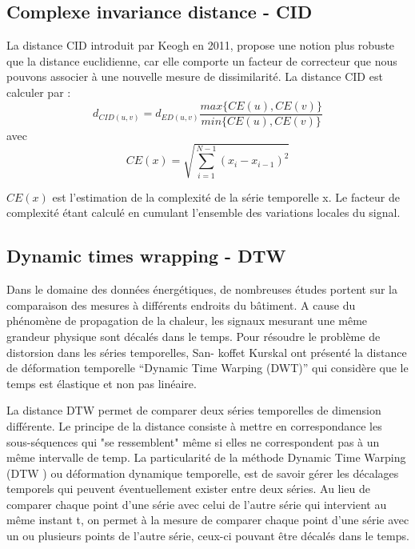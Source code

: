 \subsection{Complexe invariance distance -  CID}
La distance CID introduit par Keogh en 2011\cite{batista2011}, propose une notion plus robuste que la
distance euclidienne, car elle comporte un facteur de correcteur que nous pouvons associer à une
nouvelle mesure de dissimilarité. La distance CID est calculer par :
$$ d_{CID(u,v)} = 	d_{ED(u,v)}  \frac{max\{CE(u), CE(v) \} }  {min\{CE(u), CE(v) \} } $$
avec 
$$CE(x) = \sqrt{ \sum^{N-1}_{i = 1} {(x_i  - x_{i-1})^2} }    $$

$CE(x)$ est l’estimation de la complexité de la série temporelle x. Le facteur de complexité étant calculé en cumulant l’ensemble des variations locales du signal.
\subsection{Dynamic times wrapping - DTW}
Dans le domaine des données énergétiques, de nombreuses études portent sur la comparaison des mesures à différents endroits du bâtiment. A cause du phénomène de propagation de la chaleur, les signaux mesurant une même grandeur physique sont décalés dans le temps. Pour résoudre le problème de distorsion dans les séries temporelles, San- koffet Kurskal \cite{kruskal1983} ont présenté la distance de déformation temporelle “Dynamic Time Warping (DWT)” qui considère que le temps est élastique et non pas linéaire.

La distance DTW permet de comparer deux séries temporelles de dimension différente. Le principe de la distance consiste à mettre en correspondance les sous-séquences qui "se ressemblent" même si elles ne correspondent pas à un même intervalle de temp. La particularité de la méthode Dynamic Time Warping (DTW ) ou déformation dynamique temporelle, est de savoir gérer les décalages temporels qui peuvent éventuellement exister entre deux séries. Au lieu de comparer chaque point d’une série avec celui de l’autre série qui intervient au même instant t, on permet à la mesure de comparer chaque point d’une série avec un ou plusieurs points de l’autre série, ceux-ci pouvant être décalés dans le temps. 

